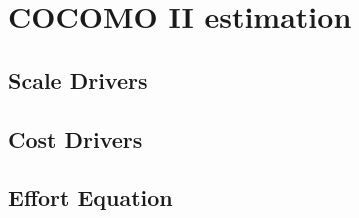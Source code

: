 \chapter{COCOMO II estimation}
\label{chap:cocomo}

\section{Scale Drivers}

\section{Cost Drivers}

\section{Effort Equation}
